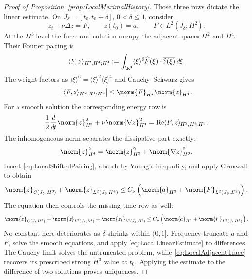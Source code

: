 \begin{proof}[Proof of Proposition~\ref{prop:LocalMaximalHistory}]
Those three rows dictate the linear estimate.  On
\(J_\delta=[t_0,t_0+\delta]\), \(0<\delta\leq1\), consider
\[
  z_t-\nu\Delta z=F,
  \qquad
  z(t_0)=a,
  \qquad
  F\in L^2(J_\delta;H^2).
\]
At the \(H^3\) level the force and solution occupy the adjacent spaces
\(H^2\) and \(H^4\).  Their Fourier pairing is
\[
  \langle F,z\rangle_{H^2,H^4;H^3}
  :=\int_{\R^3}\langle\xi\rangle^6
       \widehat F(\xi)\cdot\overline{\widehat z(\xi)}\,d\xi.
\]
The weight factors as
\(
  \langle\xi\rangle^6
  =\langle\xi\rangle^2\langle\xi\rangle^4
\)
and Cauchy--Schwarz gives
\begin{equation}
  \left|\langle F,z\rangle_{H^2,H^4;H^3}\right|
  \leq\norm{F}_{H^2}\norm{z}_{H^4}.
  \label{eq:LocalShiftedPairing}
\end{equation}
For a smooth solution the corresponding energy row is
\[
  \frac12\frac d{dt}\norm{z}_{H^3}^2
  +\nu\norm{\nabla z}_{H^3}^2
  =\operatorname{Re}\langle F,z\rangle_{H^2,H^4;H^3}.
\]
The inhomogeneous norm separates the dissipative part exactly:
\[
  \norm{z}_{H^4}^2
  =\norm{z}_{H^3}^2+\norm{\nabla z}_{H^3}^2.
\]
Insert \eqref{eq:LocalShiftedPairing}, absorb by Young’s inequality, and apply
Gronwall to obtain
\[
  \norm{z}_{C(J_\delta;H^3)}
  +\norm{z}_{L^2(J_\delta;H^4)}
  \leq
  C_\nu\left(
    \norm{a}_{H^3}+\norm{F}_{L^2(J_\delta;H^2)}
  \right).
\]
The equation then controls the missing time row as well:
\begin{equation}
  \norm{z}_{C(J_\delta;H^3)}
  +\norm{z}_{L^2(J_\delta;H^4)}
  +\norm{z_t}_{L^2(J_\delta;H^2)}
  \leq
  C_\nu\left(
    \norm{a}_{H^3}+\norm{F}_{L^2(J_\delta;H^2)}
  \right).
  \label{eq:LocalLinearEstimate}
\end{equation}
No constant here deteriorates as \(\delta\) shrinks within \((0,1]\).
Frequency-truncate \(a\) and \(F\), solve the smooth equations, and apply
\eqref{eq:LocalLinearEstimate} to differences.  The Cauchy limit solves the
untruncated problem, while \eqref{eq:LocalAdjacentTrace} recovers its prescribed
strong \(H^3\) value at \(t_0\).  Applying the estimate to the difference of two
solutions proves uniqueness.


\end{proof}

